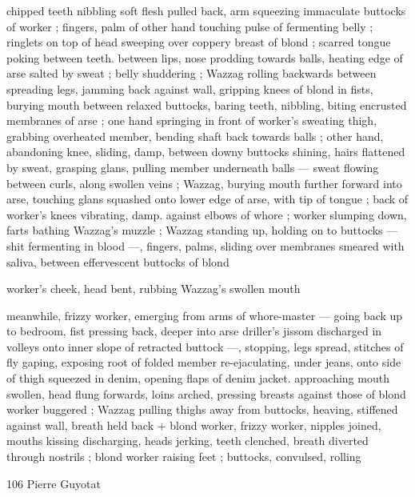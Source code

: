 chipped teeth nibbling soft flesh pulled back, arm squeezing
immaculate buttocks of worker ; fingers, palm of other hand touching
pulse of fermenting belly ; ringlets on top of head sweeping over
coppery breast of blond ; scarred tongue poking between teeth.
between lips, nose prodding towards balls, heating edge of arse
salted by sweat ; belly shuddering ; Wazzag rolling backwards
between spreading legs, jamming back against wall, gripping knees
of blond in fists, burying mouth between relaxed buttocks, baring
teeth, nibbling, biting encrusted membranes of arse ; one hand
springing in front of worker's sweating thigh, grabbing overheated
member, bending shaft back towards balls ; other hand, abandoning
knee, sliding, damp, between downy buttocks shining, hairs flattened
by sweat, grasping glans, pulling member underneath balls — sweat
flowing between curls, along swollen veins ; Wazzag, burying mouth
further forward into arse, touching glans squashed onto lower edge
of arse, with tip of tongue ; back of worker's knees vibrating, damp.
against elbows of whore ; worker slumping down, farts bathing
Wazzag's muzzle ; Wazzag standing up, holding on to buttocks —
shit fermenting in blood —, fingers, palms, sliding over membranes
smeared with saliva, between effervescent buttocks of blond

worker's cheek, head bent, rubbing Wazzag’s swollen mouth

meanwhile, frizzy worker, emerging from arms of whore-master —
going back up to bedroom, fist pressing back, deeper into arse
driller's jissom discharged in volleys onto inner slope of retracted
buttock —, stopping, legs spread, stitches of fly gaping, exposing
root of folded member re-ejaculating, under jeans, onto side of thigh
squeezed in denim, opening flaps of denim jacket. approaching
mouth swollen, head flung forwards, loins arched, pressing breasts
against those of blond worker buggered ; Wazzag pulling thighs
away from buttocks, heaving, stiffened against wall, breath held back
+ blond worker, frizzy worker, nipples joined, mouths kissing
discharging, heads jerking, teeth clenched, breath diverted through
nostrils ; blond worker raising feet ; buttocks, convulsed, rolling

106 Pierre Guyotat

